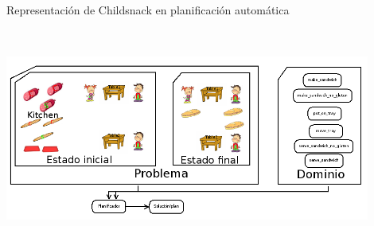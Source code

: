 \documentclass[xcolor=table]{beamer}
\begin{document}
\begin{frame}{Representación de Childsnack en planificación automática}
    \includegraphics[width=12cm,height=8cm]{childSnack2}
\end{frame}

\end{document}
